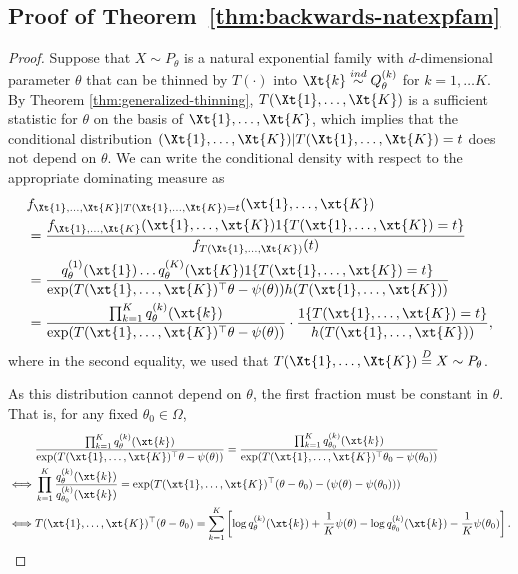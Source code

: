 \documentclass[12pt]{article}
\begin{document}
\subsection{Proof of Theorem~\ref{thm:backwards-natexpfam}}
\label{app:pf-backwards}

\begin{proof}
Suppose that $X\sim P_\theta$ is a natural exponential family with $d$-dimensional parameter $\theta$ that can be thinned by $T(\cdot)$ into $\Xt{k}\overset{ind}\sim Q_\theta^{(k)}$ for $k=1,\dots K$. By Theorem \ref{thm:generalized-thinning}, $T(\Xt{1},\dots,\Xt{K})$ is a sufficient statistic for $\theta$ on the basis of $\Xt{1},\dots,\Xt{K}$, which implies that the conditional distribution $(\Xt{1},\dots,\Xt{K})|T(\Xt{1},\dots,\Xt{K})=t$ does not depend on $\theta$. We can write the conditional density with respect to the appropriate dominating measure as
\begin{align*}
& f_{\Xt{1},\dots,\Xt{K}|T(\Xt{1},\dots,\Xt{K})=t}(\xt{1},\dots,\xt{K}) \\ 
&= \frac{f_{\Xt{1},\dots,\Xt{K}}(\xt{1},\dots,\xt{K})1\{T(\xt{1},\dots,\xt{K})=t\}}{f_{T(\Xt{1},\dots,\Xt{K})}(t)} \\
&= \frac{q^{(1)}_\theta(\xt{1})\dots q^{(K)}_\theta(\xt{K}) 1\{T(\xt{1},\dots,\xt{K})=t\}}{\exp(T(\xt{1},\dots,\xt{K})^\top\theta - \psi(\theta))h(T(\xt{1},\dots,\xt{K}))} \\
&= \frac{\prod_{k=1}^Kq^{(k)}_\theta(\xt{k})}{\exp(T(\xt{1},\dots,\xt{K})^\top\theta - \psi(\theta))} \cdot \frac{ 1\{T(\xt{1},\dots,\xt{K})=t\}}{h(T(\xt{1},\dots,\xt{K}))},
\end{align*}
where in the second equality, we used that $T(\Xt{1},\dots,\Xt{K})\overset{D}{=}X\sim P_\theta$.

As this distribution cannot depend on $\theta$, the first fraction must be constant in $\theta$. That is, for any fixed $\theta_0\in\Omega$,
\begin{align}\label{eq:qtheta}
&\frac{\prod_{k=1}^Kq^{(k)}_\theta(\xt{k})}{\exp(T(\xt{1},\dots,\xt{K})^\top\theta - \psi(\theta))} = \frac{\prod_{k=1}^Kq^{(k)}_{\theta_0}(\xt{k})}{\exp(T(\xt{1},\dots,\xt{K})^\top\theta_0 - \psi(\theta_0))}  \nonumber\\
\iff&\prod_{k=1}^K \frac{q^{(k)}_\theta(\xt{k})}{q^{(k)}_{\theta_0}(\xt{k})} = \exp(T(\xt{1},\dots,\xt{K})^\top(\theta-\theta_0) - (\psi(\theta) - \psi(\theta_0))) \nonumber\\
\iff&T(\xt{1},\dots,\xt{K})^\top(\theta-\theta_0)  = \sum_{k=1}^K \left[\log q^{(k)}_\theta(\xt{k}) + \frac{1}{K}\psi(\theta) - \log q^{(k)}_{\theta_0}(\xt{k}) - \frac{1}{K}\psi(\theta_0)\right]. 
\end{align}


\end{proof}
\end{document}
